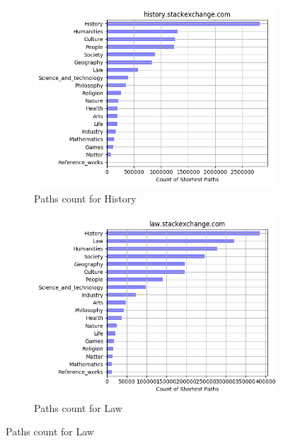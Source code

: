 \begin{figure}[H]
        
     \begin{subfigure}{0.5\textwidth}
    \centering
        \includegraphics[width=1\linewidth]{imgs/path-counts/history_stackexchange_com}
        \caption{Paths count for History}
        \label{fig:path-history}
    \end{subfigure}%
    \begin{subfigure}{0.5\textwidth}
    \centering
        \includegraphics[width=1\linewidth]{imgs/path-counts/law_stackexchange_com}
        \caption{Paths count for Law}
        \label{fig:path-law}
    \end{subfigure} 

    \end{figure}
    
